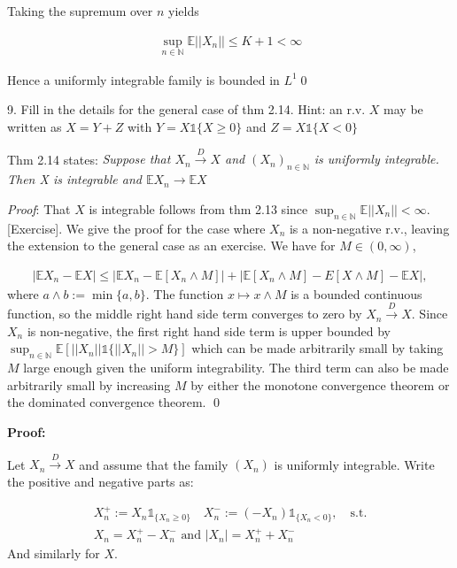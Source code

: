 \documentclass[10pt]{article}
\begin{document}
Taking the supremum over $n$ yields 

\begin{gather*}
    \sup_{n\in \mathbb{N}}\mathbb{E}||X_n|| \leq K + 1 < \infty
\end{gather*}

Hence a uniformly integrable family is bounded in $L^1$\qed

\hfill 

\newpage

9. Fill in the details for the general case of thm 2.14. Hint: an r.v. $X$ may be written as $X = Y + Z$ with $Y = X \mathbb{1}\{X \geq 0\}$ and $Z = X \mathbb{1}\{X < 0\}$

Thm 2.14 states: \textit{Suppose that $X_n \xrightarrow{D} X$ and $(X_n)_{n \in \mathbb{N}}$ is uniformly integrable. Then X is integrable and $\mathbb{E}X_n \to \mathbb{E}X$}

\textit{Proof}: That $X$ is integrable follows from thm 2.13 since $\sup_{n \in \mathbb{N}} \mathbb{E} ||X_n|| < \infty$. [Exercise]. We give the proof for the case where $X_n$ is a non-negative r.v., leaving the extension to the general case as an exercise. We have for $M \in (0, \infty)$,

\begin{gather*}
    |\mathbb{E}X_n - \mathbb{E}X| \leq |\mathbb{E}X_n - \mathbb{E}[X_n \land M]| + |\mathbb{E}[X_n \land M] - E[X \land M] - \mathbb{E}X|,
\end{gather*}
where $a \land b := \min\{a, b\}$. The function $x \mapsto x \land M$ is a bounded continuous function, so the middle right hand side term converges to zero by $X_n \xrightarrow{D} X$. Since $X_n$ is non-negative, the first right hand side term is upper bounded by $\sup_{n \in \mathbb{N}}\mathbb{E}[||X_n||\mathbb{1}\{||X_n|| > M\}]$ which can be made arbitrarily small by taking $M$ large enough given the uniform integrability. The third term can also be made arbitrarily small by increasing $M$ by either the monotone convergence theorem or the dominated convergence theorem. \qed

\textbf{Proof: }

Let $X_n \xrightarrow{D} X$ and assume that the family $(X_n)$ is uniformly integrable. Write the positive and negative parts as:

\begin{gather*}
    X_n^+ := X_n \mathbb{1}_{\{X_n \ge 0\}}\quad X_n^- := (-X_n)\mathbb{1}_{\{X_n < 0\}}, \quad\text{s.t.}\\
    X_n = X_n^+ - X_n^- \text{ and } |X_n| = X_n^+ + X_n^-
\end{gather*}
And similarly for $X$.
\end{document}
